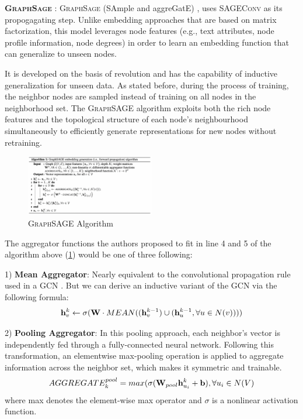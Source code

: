 \documentclass[sigconf, nonacm]{acmart}
\begin{document}
\textbf{\textsc{GraphSage}} : \textsc{GraphSage} (SAmple and aggreGatE) \cite{Hamiltonetal.2017}, uses \textsc{SAGEConv} as its propogagating step. Unlike embedding approaches that are based on matrix factorization, this model leverages node features (e.g., text attributes, node profile information, node degrees) in order to learn an embedding function that can generalize to unseen nodes. 

It is developed on the basis of revolution and has the capability of inductive generalization for unseen data. As stated before, during the process of training, the neighbor nodes are sampled instead of training on all nodes in the neighborhood set. The \textsc{GraphSAGE} algorithm exploits both the rich node features and the topological structure of each node’s neighbourhood simultaneously to efficiently generate representations for new nodes without retraining.

\begin{figure}[h]
    \centering
    \includegraphics[width=0.5\textwidth]{GraphSAGE.png}
    \caption{\textsc{GraphSAGE} Algorithm \cite{Hamiltonetal.2017}}
    \label{fig:GraphSage}
\end{figure}
 
The aggregator functions the authors proposed to fit in line 4 and 5 of the algorithm above (\ref{fig:GraphSage}) would be one of three following:

1) \textbf{Mean Aggregator}: Nearly equivalent to the convolutional propagation rule used in a \textsc{GCN} \cite{Kipf&Welling2017}. But we can derive an inductive variant of the \textsc{GCN} \cite{Kipf&Welling2017} via the following formula:
\begin{align}
    \centering
    \mathbf{h}_v^k \leftarrow \sigma(\mathbf{W} \cdot MEAN( ({\mathbf{h}^{k-1}_v})  \cup  ({\mathbf{h}^{k-1}_u, \forall u \in N(v)})))
    \label{mean_agg}
\end{align} 

2) \textbf{Pooling Aggregator}: In this pooling approach, each neighbor’s vector is independently fed through a fully-connected neural network. Following this transformation, an elementwise max-pooling operation is applied to aggregate information across the neighbor set, which makes it symmetric and trainable. 
\begin{align}
    \centering
    AGGREGATE_k^{pool} =  max( { \sigma(\mathbf{W}_{pool} \mathbf{h}^k_{u_i} + \mathbf{b}), \forall u_i \in N(V)}
    \label{pool_agg}
\end{align} 
where max denotes the element-wise max operator and $\sigma$ is a nonlinear activation function. 
\end{document}

